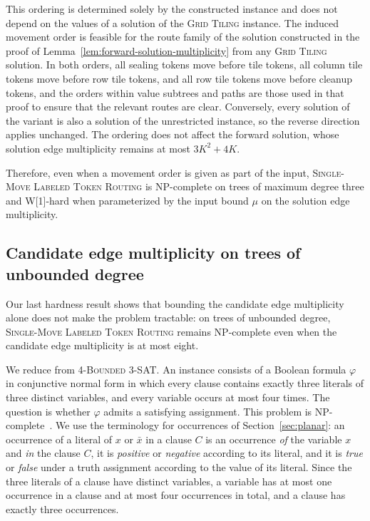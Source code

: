 \documentclass[a4paper,USenglish,thm-restate]{lipics-v2021}
\theoremstyle{problemstyle}
\begin{document}
This ordering is determined solely by the constructed instance and does not depend on the values of a solution of the \textsc{Grid Tiling} instance. The induced movement order is feasible for the route family of the solution constructed in the proof of Lemma~\ref{lem:forward-solution-multiplicity} from any \textsc{Grid Tiling} solution. In both orders, all sealing tokens move before tile tokens, all column tile tokens move before row tile tokens, and all row tile tokens move before cleanup tokens, and the orders within value subtrees and paths are those used in that proof to ensure that the relevant routes are clear. Conversely, every solution of the variant is also a solution of the unrestricted instance, so the reverse direction applies unchanged. The ordering does not affect the forward solution, whose solution edge multiplicity remains at most $3K^2+4K$.

Therefore, even when a movement order is given as part of the input, \textsc{Single-Move Labeled Token Routing} is \textsf{NP}-complete on trees of maximum degree three and \textsf{W}[1]-hard when parameterized by the input bound $\mu$ on the solution edge multiplicity.




\subsection{Candidate edge multiplicity on trees of unbounded degree}
\label{sec:cm-hardness}
Our last hardness result shows that bounding the candidate edge multiplicity
alone does not make the problem tractable: on trees of unbounded degree,
\textsc{Single-Move Labeled Token Routing} remains \textsf{NP}-complete even
when the candidate edge multiplicity is at most eight.

We reduce from \textsc{4-Bounded 3-SAT}. An instance consists of a Boolean
formula $\varphi$ in conjunctive normal form in which every clause contains
exactly three literals of three distinct variables, and every variable
occurs at most four times. The question is whether $\varphi$ admits a
satisfying assignment. This problem is
\textsf{NP}-complete~\cite{DBLP:journals/dam/Tovey84}. We use the
terminology for occurrences of Section~\ref{sec:planar}: an occurrence of a
literal of $x$ or $\bar x$ in a clause $C$ is an occurrence \emph{of} the
variable $x$ and \emph{in} the clause $C$, it is \emph{positive} or
\emph{negative} according to its literal, and it is \emph{true} or
\emph{false} under a truth assignment according to the value of its
literal. Since the three literals of a clause have distinct variables, a
variable has at most one occurrence in a clause and at most four
occurrences in total, and a clause has exactly three occurrences.
\end{document}
